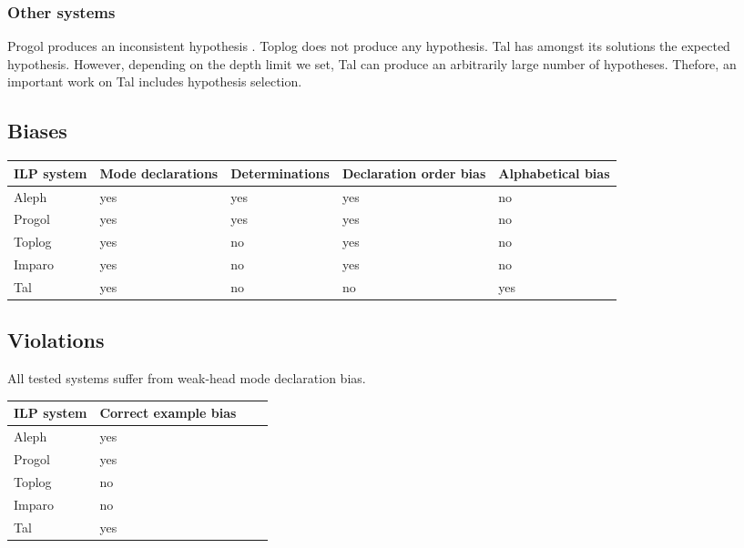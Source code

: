 \subsubsection{Other systems}
Progol produces an inconsistent hypothesis . Toplog does not produce any hypothesis. Tal has amongst its solutions the expected hypothesis. However, depending on the depth limit we set, Tal can produce an arbitrarily large number of hypotheses. Thefore, an important work on Tal includes hypothesis selection.

\subsection{Biases}
\begin{center}
    \begin{tabular}{ | l | l | l | l | p{5cm} |}
    \hline
    ILP system & Mode declarations & Determinations & Declaration order bias & Alphabetical bias \\ \hline
    Aleph & yes & yes & yes & no\\ \hline
    Progol & yes & yes & yes & no\\ \hline
    Toplog & yes & no & yes & no\\ \hline
    Imparo & yes & no & yes & no\\ \hline
    Tal & yes & no & no & yes\\ \hline
    \hline
    \end{tabular}
\end{center}

\subsection{Violations}
All tested systems suffer from weak-head mode declaration bias.
\begin{center}
    \begin{tabular}{ | l | l | l | p{5cm} |}
    \hline
    ILP system & Correct example bias\\ \hline
    Aleph & yes\\ \hline
    Progol & yes\\ \hline
    Toplog & no\\ \hline
    Imparo & no\\ \hline
    Tal & yes\\ \hline
    \hline
    \end{tabular}
\end{center}

